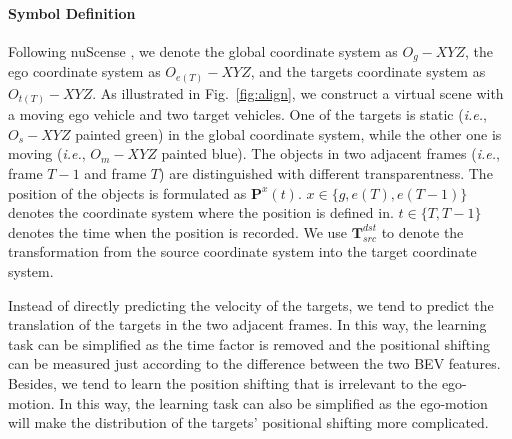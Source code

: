 \documentclass[10pt,twocolumn,letterpaper]{article}
\begin{document}
\paragraph{Symbol Definition} Following nuScense \cite{NS}, we denote the global coordinate system as $O_g-XYZ$, the ego coordinate system as $O_{e(T)}-XYZ$, and the targets coordinate system as $O_{t(T)}-XYZ$. As illustrated in Fig.~\ref{fig:align}, we construct a virtual scene with a moving ego vehicle and two target vehicles. One of the targets is static (\textit{i.e.}, $O_{s}-XYZ$ painted green) in the global coordinate system, while the other one is moving (\textit{i.e.}, $O_{m}-XYZ$ painted blue). The objects in two adjacent frames (\textit{i.e.}, frame $T-1$ and frame $T$) are distinguished with different transparentness. The position of the objects is formulated as $\textbf{P}^x(t)$. $x\in\{g,e(T),e(T-1)\}$ denotes the coordinate system where the position is defined in. $t\in\{T,T-1\}$ denotes the time when the position is recorded. We use $\textbf{T}^{dst}_{src}$ to denote the transformation from the source coordinate system into the target coordinate system.

Instead of directly predicting the velocity of the targets, we tend to predict the translation of the targets in the two adjacent frames. In this way, the learning task can be simplified as the time factor is removed and the positional shifting can be measured just according to the difference between the two BEV features. Besides, we tend to learn the position shifting that is irrelevant to the ego-motion. In this way, the learning task can also be simplified as the ego-motion will make the distribution of the targets' positional shifting more complicated.
\end{document}
